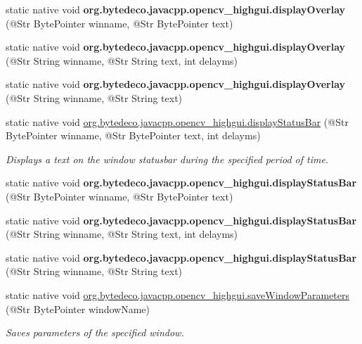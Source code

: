 \begin{DoxyCompactItemize}
static native void {\bfseries org.\+bytedeco.\+javacpp.\+opencv\+\_\+highgui.\+display\+Overlay} (@Str Byte\+Pointer winname, @Str Byte\+Pointer text)
\item 
\mbox{\label{group__highgui__qt_ga8ac3d9680e5842dd0b898cfcd86d0f56}} 
static native void {\bfseries org.\+bytedeco.\+javacpp.\+opencv\+\_\+highgui.\+display\+Overlay} (@Str String winname, @Str String text, int delayms)
\item 
\mbox{\label{group__highgui__qt_gab282b940590a7dcc62b9f238e163f0cb}} 
static native void {\bfseries org.\+bytedeco.\+javacpp.\+opencv\+\_\+highgui.\+display\+Overlay} (@Str String winname, @Str String text)
\item 
static native void \hyperlink{group__highgui__qt_ga50de3d06722cc9fbc0054f3c83902f1f}{org.\+bytedeco.\+javacpp.\+opencv\+\_\+highgui.\+display\+Status\+Bar} (@Str Byte\+Pointer winname, @Str Byte\+Pointer text, int delayms)
\begin{DoxyCompactList}\small\item\em Displays a text on the window statusbar during the specified period of time. \end{DoxyCompactList}\item 
\mbox{\label{group__highgui__qt_gac836f33469d9f3fd98c3893e5c32a812}} 
static native void {\bfseries org.\+bytedeco.\+javacpp.\+opencv\+\_\+highgui.\+display\+Status\+Bar} (@Str Byte\+Pointer winname, @Str Byte\+Pointer text)
\item 
\mbox{\label{group__highgui__qt_gaf2f3872accc79c44498b025a4a58feb7}} 
static native void {\bfseries org.\+bytedeco.\+javacpp.\+opencv\+\_\+highgui.\+display\+Status\+Bar} (@Str String winname, @Str String text, int delayms)
\item 
\mbox{\label{group__highgui__qt_ga9ca876bfa57872ca4f80cb17326d18af}} 
static native void {\bfseries org.\+bytedeco.\+javacpp.\+opencv\+\_\+highgui.\+display\+Status\+Bar} (@Str String winname, @Str String text)
\item 
static native void \hyperlink{group__highgui__qt_gac1ea25caaa8647ae67972ac417776344}{org.\+bytedeco.\+javacpp.\+opencv\+\_\+highgui.\+save\+Window\+Parameters} (@Str Byte\+Pointer window\+Name)
\begin{DoxyCompactList}\small\item\em Saves parameters of the specified window. \end{DoxyCompactList}\item 

\end{DoxyCompactItemize}

